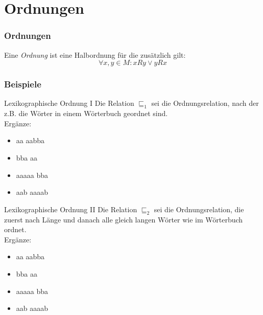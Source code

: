 \section{Ordnungen}
\begin{frame}
	\frametitle{Ordnungen}
	\begin{definition}
		Eine \emph{Ordnung} ist eine Halbordnung für die zusätzlich gilt:
		$$\forall x,y\in M: xRy \vee yRx$$
	\end{definition}
\end{frame}
\begin{frame}
	\frametitle{Beispiele}
	\begin{exampleblock}{Lexikographische Ordnung I}
		Die Relation \emph{$\sqsubseteq_1$} sei die Ordnungsrelation, nach der z.B. die Wörter in einem Wörterbuch geordnet sind.\\
		Ergänze:
		\begin{itemize}
			\item aa \visible<2->{$\sqsubseteq_1$} aabba
			\item bba \visible<3->{$\sqsupseteq_1$} aa
			\item aaaaa \visible<4->{$\sqsubseteq_1$} bba
			\item aab \visible<5->{$\sqsupseteq_1$} aaaab
		\end{itemize}
	\end{exampleblock}
\end{frame}
\begin{frame}
	\begin{exampleblock}{Lexikographische Ordnung II}
		Die Relation \emph{$\sqsubseteq_2$} sei die Ordnungsrelation, die zuerst nach Länge und danach alle gleich langen Wörter wie im Wörterbuch ordnet.\\
		Ergänze:
		\begin{itemize}
			\item aa \visible<2->{$\sqsubseteq_1$} aabba
			\item bba \visible<3->{$\sqsupseteq_1$} aa
			\item aaaaa \visible<4->{$\sqsupseteq_1$} bba
			\item aab \visible<5->{$\sqsubseteq_1$} aaaab
		\end{itemize}
	\end{exampleblock}
\end{frame}